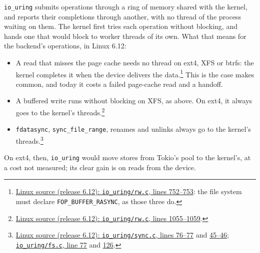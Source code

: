 \texttt{io\_uring} submits operations through a ring of memory shared with
the kernel, and reports their completions through another, with no thread
of the process waiting on them. The kernel first tries each operation
without blocking, and hands one that would block to worker threads of its
own. What that means for the backend's operations, in Linux 6.12:
\begin{itemize}
  \item A read that misses the page cache needs no thread on ext4, XFS or
    btrfs: the kernel completes it when the device delivers the
    data.\footnote{\href{https://github.com/torvalds/linux/blob/v6.12/io_uring/rw.c\#L752-L753}{Linux
    source (release 6.12): \texttt{io\_uring/rw.c}, lines 752--753}: the file
    system must declare \texttt{FOP\_BUFFER\_RASYNC}, as those three do.}
    This is the case  makes common, and
    today it costs a failed page-cache read and a handoff.
  \item A buffered write runs without blocking on XFS, as above. On ext4, it
    always goes to the kernel's
    threads.\footnote{\href{https://github.com/torvalds/linux/blob/v6.12/io_uring/rw.c\#L1055-L1059}{Linux
    source (release 6.12): \texttt{io\_uring/rw.c}, lines 1055--1059}.}
  \item \texttt{fdatasync}, \texttt{sync\_file\_range}, renames and unlinks
    always go to the kernel's
    threads.\footnote{\href{https://github.com/torvalds/linux/blob/v6.12/io_uring/sync.c\#L76-L77}{Linux
    source (release 6.12): \texttt{io\_uring/sync.c}, lines 76--77} and
    \href{https://github.com/torvalds/linux/blob/v6.12/io_uring/sync.c\#L45-L46}{45--46};
    \href{https://github.com/torvalds/linux/blob/v6.12/io_uring/fs.c\#L77}{\texttt{io\_uring/fs.c},
    line 77} and \href{https://github.com/torvalds/linux/blob/v6.12/io_uring/fs.c\#L126}{126}.}
\end{itemize}
On ext4, then, \texttt{io\_uring} would move stores from Tokio's pool to the
kernel's, at a cost not measured; its clear gain is on reads from the
device.

